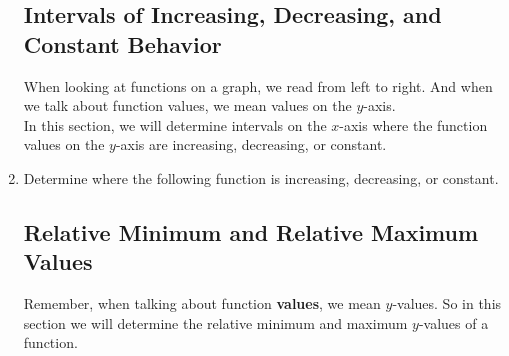 \begin{enumerate}
\subsection{Intervals of Increasing, Decreasing, and Constant Behavior}
When looking at functions on a graph, we read from left to right.
And when we talk about function values, we mean values on the $y$-axis.\\[.1in]

In this section, we will determine intervals on the $x$-axis where the
function values on the $y$-axis are increasing, decreasing, or
constant.

\item Determine where the following function is increasing, decreasing, or constant.\\

\newpage

\subsection{Relative Minimum and Relative Maximum Values}
Remember, when talking about function \textbf{values}, we mean
$y$-values.  So in this section we will determine the relative minimum
and maximum $y$-values of a function.


\end{enumerate}
